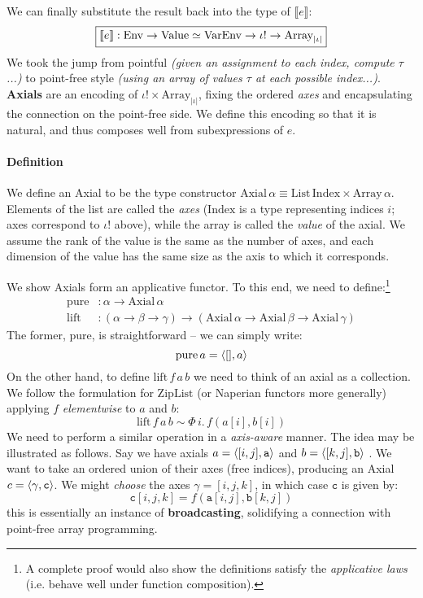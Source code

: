 We can finally substitute the result back into the type of $\llbracket e \rrbracket$:
$$ \boxed{ \llbracket e \rrbracket : \mathrm{Env} \to \mathrm{Value} \simeq \mathrm{VarEnv} \to \iota! \to \mathrm{Array}_{|\iota|} } $$
We took the jump from pointful \textit{(given an assignment to each index, compute $\tau$...)} to point-free style \textit{(using an array of values $\tau$ at each possible index...)}. \textbf{Axials} are an encoding of $\iota! \times \mathrm{Array}_{|\iota|}$, fixing the ordered \textit{axes} and encapsulating the connection on the point-free side. We define this encoding so that it is natural, and thus composes well from subexpressions of $e$.

\needspace{7em}
\paragraph{Definition} 
We define an Axial to be the type constructor $\mathrm{Axial}\,\alpha \equiv \mathrm{List}\,\mathrm{Index} \times \mathrm{Array}\,\alpha$. Elements of the list are called the \textit{axes} ($\mathrm{Index}$ is a type representing indices $i$; axes correspond to $\iota!$ above), while the array is called the \textit{value} of the axial. We assume the rank of the value is the same as the number of axes, and each dimension of the value has the same size as the axis to which it corresponds.

We show Axials form an applicative functor. To this end, we need to define:\footnote{A complete proof would also show the definitions satisfy the \textit{applicative laws} (i.e. behave well under function composition).}
\begin{align*}
\mathrm{pure} &: \alpha \to \mathrm{Axial}\,\alpha \\
\mathrm{lift} &: (\alpha \to \beta \to \gamma) \to (\mathrm{Axial}\,\alpha \to \mathrm{Axial}\,\beta \to \mathrm{Axial}\,\gamma) 
\end{align*}
The former, $\mathrm{pure}$, is straightforward -- we can simply write:
$$ \mathrm{pure}\,a = \phipair{[]}{a} $$
On the other hand, to define $\mathrm{lift}\,f\,a\,b$ we need to think of an axial as a collection. We follow the formulation for $\mathrm{ZipList}$ (or Naperian functors \cite{gibbons2016aplicative} more generally) applying $f$ \textit{elementwise} to $a$ and $b$:
$$ \mathrm{lift}\,f\,a\,b \sim \Phi\, i.\, f(a[i], b[i]) $$
We need to perform a similar operation in a \textit{axis-aware} manner. The idea may be illustrated as follows. Say we have axials $a = \phipair{[i, j]}{\texttt{a}}$ and $b = \phipair{[k, j]}{\texttt{b}}$ . We want to take an ordered union of their axes (free indices), producing an Axial $c = \phipair{\gamma}{\texttt{c}}$. We might \textit{choose} the axes $\gamma = [i, j, k]$, in which case $\texttt{c}$ is given by:
$$ \texttt{c}[i, j, k] = f(\texttt{a}[i, j], \texttt{b}[k, j]) $$
this is essentially an instance of \textbf{broadcasting}, solidifying a connection with point-free array programming.

